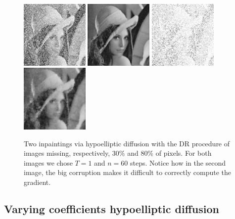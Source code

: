 \documentclass[proc]{edpsmath}
\begin{document}
\begin{figure}
  \includegraphics[height = 3.3cm]{imgs/lena-random-30}
  \includegraphics[height = 3.3cm]{imgs/lena-random-30-mask}\qquad
  \includegraphics[height = 3.3cm]{imgs/lena-random-80}
  \includegraphics[height = 3.3cm]{imgs/lena-random-80-mask}
  \caption{Two inpaintings via {hypoelliptic diffusion with} the DR procedure of images missing, respectively, 30\% and 80\% of pixels. For both images we chose $T=1$ and $n=60$ steps. Notice how in the second image, the big corruption makes it difficult to correctly compute the gradient.}
  \label{fig:masking-highly}
\end{figure}




\subsection{Varying coefficients hypoelliptic diffusion}\label{sec:varying}
\end{document}
